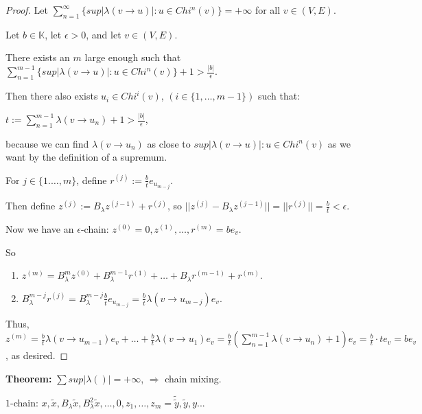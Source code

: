 \documentclass{article}
\begin{document}
\begin{enumerate}
\begin{proof}
    Let $\displaystyle\sum^\infty_{n=1}\{sup|\lambda(v\rightarrow u)|:u\in Chi^n(v)\}=+\infty$ for all $v\in (V,E)$. 
    
    \medskip 
    
    Let $b\in\mathbb{K}$, let $\epsilon>0$, and let $v\in(V,E)$. 

    There exists an $m$ large enough such that $\displaystyle\sum^{m-1}_{n=1}\{sup|\lambda(v\rightarrow u)|:u\in Chi^n(v)\}+1>\frac{|b|}{\epsilon}$.

    Then there also exists $u_i\in Chi^i(v)$, $(i\in\{1,\dots,m-1\})$ such that:

    \medskip
    
    \centerline{$t:=\displaystyle\sum^{m-1}_{n=1}\lambda(v\rightarrow u_n)+1>\frac{|b|}{\epsilon}$,} 
    
    because we can find $\lambda(v\rightarrow u_n)$ as close to $sup|\lambda(v\rightarrow u)|:u \in Chi^n(v)$ as we want by the definition of a supremum. 

    For $j\in \{1.\dots,m\}$, define $r^{(j)}:=\frac{b}{t}e_{u_{m-j}}$.

    Then define $z^{(j)}:=B_\lambda z^{(j-1)}+r^{(j)}$, so $||z^{(j)}-B_\lambda z^{(j-1)}||=||r^{(j)}||=\frac{b}{t}<\epsilon$.

    Now we have an $\epsilon$-chain: $z^{(0)}=0,z^{(1)},\dots,r^{(m)}=be_v$.

    So
    \begin{enumerate}
        \item $z^{(m)}=B_\lambda^m z^{(0)}+B_\lambda^{m-1}r^{(1)}+\dots+B_\lambda r^{(m-1)}+r^{(m)}$.

        \item $B_\lambda^{m-j}r^{(j)}= B_\lambda^{m-j}\frac{b}{t}e_{u_{m-j}}=\frac{b}{t}\lambda(v \rightarrow u_{m-j})e_v$.
    \end{enumerate}
   

    Thus, $z^{(m)}= \frac{b}{t}\lambda(v\rightarrow u_{m-1})e_v+\dots+\frac{b}{t}\lambda(v\rightarrow u_1)e_v=\frac{b}{t}(\displaystyle\sum^{m-1}_{n=1}\lambda(v\rightarrow u_n)+1)e_v=\frac{b}{t}\cdot te_v=be_v$, as desired.
\end{proof}

\textbf{Theorem:} $\displaystyle\sum sup|\lambda()|=+\infty$, $\Rightarrow$ chain mixing.

$1$-chain: $x,\tilde{x},B_\lambda\tilde{x}, B^2_\lambda\tilde{x},\dots,0,z_1,\dots,z_m=\tilde{\tilde{y}},\tilde{y},y$...





\end{enumerate}
\end{document}
